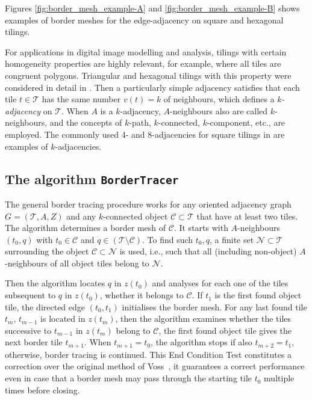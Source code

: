 Figures \ref{fig:border_mesh_example-A} and \ref{fig:border_mesh_example-B} shows examples of border meshes for the edge-adjacency on square and hexagonal tilings. 

For applications in digital image modelling and analysis, tilings with certain homogeneity properties are highly relevant, for example, where all tiles are congruent polygons. Triangular and hexagonal tilings with this property were considered in detail in \cite{WiederholdMatosWiederhold2026}. Then a particularly simple adjacency satisfies that each tile $t\in \mathcal{T}$ has the same number $v(t)=k$ of neighbours, which defines a \emph{$k$-adjacency} on $\mathcal{T}$. When $A$ is a $k$-adjacency, $A$-neighbours also are called $k$-neighbours, and the concepts of $k$-path, $k$-connected, $k$-component, etc., are employed.  The commonly used 4- and 8-adjacencies for square tilings in \cite{gonzalez2018,klette2004} are examples of $k$-adjacencies. 


\subsection{The algorithm \texttt{BorderTracer}}

The general border tracing procedure \cite[Algorithm~1]{WiederholdMatosWiederhold2026} works for any oriented adjacency graph $G = (\mathcal{T},A,Z)$ and any $k$-connected object $\mathcal{C}\subset\mathcal{T}$ that have at least two tiles. The algorithm determines a border mesh of $\mathcal{C}$. It starts with $A$-neighbours $(t_0,q)$ with $t_0\in\mathcal{C}$ and $q\in (\mathcal{T}\setminus\mathcal{C})$. To find such $t_0,q$, a finite set $\mathcal{N}\subset\mathcal{T}$ surrounding the object $\mathcal{C}\subset\mathcal{N}$ is used, i.e., such that all (including non-object) $A$-neighbours of all object tiles belong to $\mathcal{N}$. 

Then the algorithm locates $q$ in $z(t_0)$ and analyses for each one of the tiles subsequent to $q$ in $z(t_0)$, whether it belongs to $\mathcal{C}$. If $t_1$ is the first found object tile, the directed edge $(t_0, t_1)$ initialises the border mesh. For any last found tile $t_m$, $t_{m-1}$ is located in $z(t_m)$, then the algorithm examines whether the tiles successive to $t_{m-1}$ in $z(t_m)$ belong to $\mathcal{C}$, the first found object tile gives the next border tile $t_{m+1}$. When $t_{m+1}= t_0$, the algorithm stops if also $t_{m+2}= t_1$, otherwise, border tracing is continued. This End Condition Test constitutes a correction over the original method of Voss~\cite{voss1993}, it guarantees a correct performance even in case that a border mesh may pass through the starting tile $t_0$ multiple times before closing.

